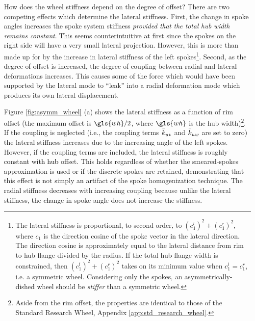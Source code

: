 \documentclass[\rootdir/thesis.tex]{subfiles}
\begin{document}
How does the wheel stiffness depend on the degree of offset? There are two competing effects which determine the lateral stiffness. First, the change in spoke angles increases the spoke system stiffness \emph{provided that the total hub width remains constant}. This seems counterintuitive at first since the spokes on the right side will have a very small lateral projection. However, this is more than made up for by the increase in lateral stiffness of the left spokes\footnote{The lateral stiffness is proportional, to second order, to $(c_1^l)^2 + (c_1^r)^2$, where $c_1$ is the direction cosine of the spoke vector in the lateral direction. The direction cosine is approximately equal to the lateral distance from rim to hub flange divided by the radius. If the total hub flange width is constrained, then $(c_1^l)^2 + (c_1^r)^2$ takes on its minimum value when $c_1^l = c_1^r$, i.e. a symmetric wheel. Considering only the spokes, an asymmetrically-dished wheel should be \emph{stiffer} than a symmetric wheel.}. Second, as the degree of offset is increased, the degree of coupling between radial and lateral deformations increases. This causes some of the force which would have been supported by the lateral mode to ``leak'' into a radial deformation mode which produces its own lateral displacement.

Figure \ref{fig:asymm_wheel} (a) shows the lateral stiffness as a function of rim offset (the maximum offset is $\gls{wh}/2$, where $\gls{wh}$ is the hub width)\footnote{Aside from the rim offset, the properties are identical to those of the Standard Research Wheel, Appendix \ref{app:std_research_wheel}.}. If the coupling is neglected (i.e., the coupling terms $\bar{k}_{uv}$ and $\bar{k}_{uw}$ are set to zero) the lateral stiffness increases due to the increasing angle of the left spokes. However, if the coupling terms are included, the lateral stiffness is roughly constant with hub offset. This holds regardless of whether the smeared-spokes approximation is used or if the discrete spokes are retained, demonstrating that this effect is not simply an artifact of the spoke homogenization technique. The radial stiffness decreases with increasing coupling because unlike the lateral stiffness, the change in spoke angle does not increase the stiffness.
\end{document}
